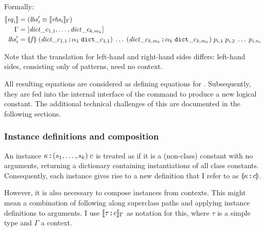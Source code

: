 \noindent
Formally:
\begin{align*}
  \llbracket\mathit{eq}_i\rrbracket &= (\mathit{lhs}'_i \equiv \llbracket\mathit{rhs}_i\rrbracket_\Gamma) \\
  \Gamma &= [ \mathit{dict}\_c_{1,1}, \ldots, \mathit{dict}\_c_{k,m_k} ] \\
  \mathit{lhs}'_i &= \llparenthesis f\rrparenthesis\;(\mathit{dict}\_c_{1,1} \mathbin{:\!\!:} \alpha_1\;\texttt{\textup{dict}}\_c_{1,1})\;\ldots\;(\mathit{dict}\_c_{k,m_k} \mathbin{:\!\!:} \alpha_k\;\texttt{\textup{dict}}\_c_{k,m_k})\;p_{i,1}\;p_{i,2}\;\ldots\;p_{i,n_i}
\end{align*}

\noindent
Note that the translation for left-hand and right-hand sides differs:
left-hand sides, consisting only of patterns, need no context.

All resulting equations are considered as defining equations for .
Subsequently, they are fed into the internal interface of the  command to produce a new logical constant.
The additional technical challenges of this are documented in the following sections.

\subsubsection{Instance definitions and composition}

An instance $\kappa \mathbin{:\!\!:} (s_1, \ldots, s_k)\;c$ is treated as if it is a (non-class) constant with no arguments, returning a dictionary containing instantiations of all class constants.
Consequently, each instance gives rise to a new definition that I refer to as $\llparenthesis\kappa \mathbin{:\!\!:} c\rrparenthesis$.

However, it is also necessary to compose instances from contexts.
This might mean a combination of following along superclass paths and applying instance definitions to arguments.
I use $\llbracket\tau \mathbin{:\!\!:} c\rrbracket_\Gamma$ as notation for this, where $\tau$ is a simple type and $\Gamma$ a context.

